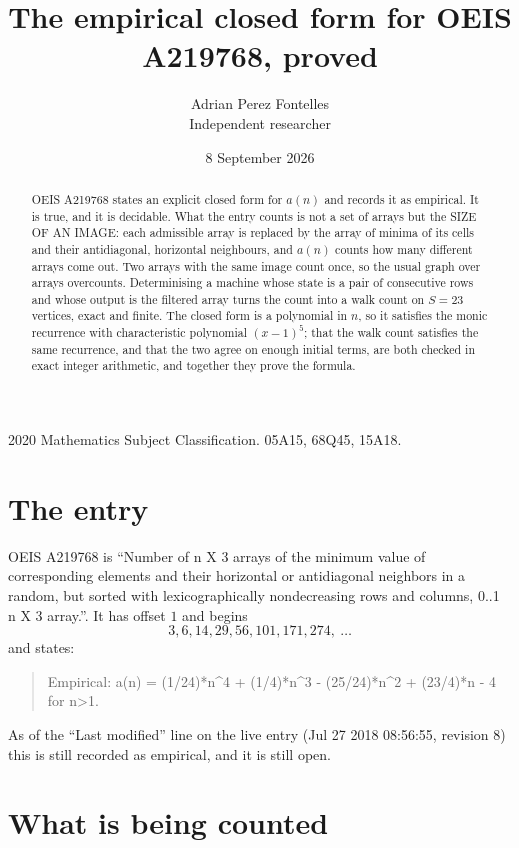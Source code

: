 \documentclass[11pt,a4paper]{article}
\title{The empirical closed form for OEIS A219768, proved}
\author{Adrian Perez Fontelles\\ \small Independent researcher}
\date{8 September 2026}
\theoremstyle{plain}
\theoremstyle{definition}
\begin{document}
\maketitle

\begin{abstract}
OEIS A219768 states an explicit closed form for $a(n)$ and records it as empirical. It is true, and
it is decidable. What the entry counts is not a set of arrays but the SIZE OF AN IMAGE: each
admissible array is replaced by the array of minima of its cells and their antidiagonal, horizontal neighbours,
and $a(n)$ counts how many different arrays come out. Two arrays with the same image count
once, so the usual graph over arrays overcounts. Determinising a machine whose state is a pair
of consecutive rows and whose output is the filtered array turns the count into a walk count on
$S=23$ vertices, exact and finite. The closed form is a polynomial in $n$, so it satisfies the
monic recurrence with characteristic polynomial $(x-1)^{5}$; that the walk count
satisfies the same recurrence, and that the two agree on enough initial terms, are both checked
in exact integer arithmetic, and together they prove the formula.
\end{abstract}

\noindent\small 2020 Mathematics Subject Classification. 05A15, 68Q45, 15A18.\normalsize

\section{The entry}

OEIS A219768 is ``Number of n X 3 arrays of the minimum value of corresponding elements and their horizontal or antidiagonal neighbors in a random, but sorted with lexicographically nondecreasing rows and columns, 0..1 n X 3 array.''. It has offset $1$ and begins
\[
3, 6, 14, 29, 56, 101, 171, 274,\ \dots
\]
and states:
\begin{quote}
Empirical: a(n) = (1/24)*n\^{}4 + (1/4)*n\^{}3 - (25/24)*n\^{}2 + (23/4)*n - 4 for n>1.
\end{quote}
As of the ``Last modified'' line on the live entry (Jul 27 2018 08:56:55, revision 8)
this is still recorded as empirical, and it is still open.

\section{What is being counted}
\end{document}

